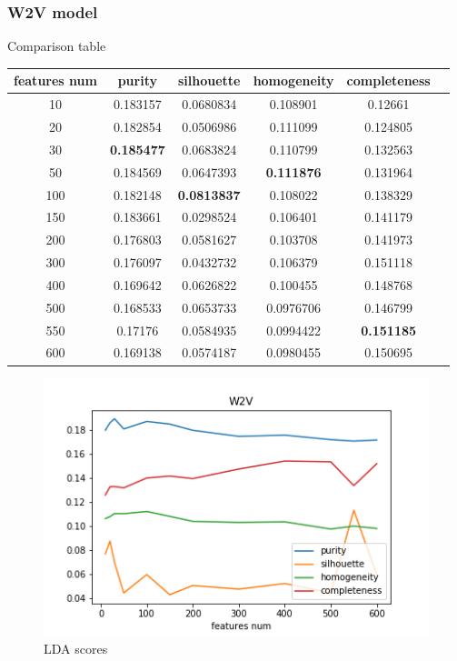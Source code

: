 \documentclass[11pt]{article}
\begin{document}
\subsubsection{W2V model}

Comparison table

\begin{center}
\begin{tabular}{ |c|c|c|c|c|c| }
\hline
features num & purity  & silhouette  & homogeneity  & completeness\\ \hline 
10  & 0.183157  & 0.0680834  & 0.108901  & 0.12661\\ \hline 
20  & 0.182854  & 0.0506986  & 0.111099  & 0.124805\\ \hline 
30  & \textbf{0.185477}  & 0.0683824  & 0.110799  & 0.132563\\ \hline 
50  & 0.184569  & 0.0647393  & \textbf{0.111876}  & 0.131964\\ \hline 
100  & 0.182148  & \textbf{0.0813837}  & 0.108022  & 0.138329\\ \hline 
150  & 0.183661  & 0.0298524  & 0.106401  & 0.141179\\ \hline 
200  & 0.176803  & 0.0581627  & 0.103708  & 0.141973\\ \hline 
300  & 0.176097  & 0.0432732  & 0.106379  & 0.151118\\ \hline 
400  & 0.169642  & 0.0626822  & 0.100455  & 0.148768\\ \hline 
500  & 0.168533  & 0.0653733  & 0.0976706  & 0.146799\\ \hline 
550  & 0.17176  & 0.0584935  & 0.0994422  & \textbf{0.151185}\\ \hline 
600  & 0.169138  & 0.0574187  & 0.0980455  & 0.150695\\ \hline \end{tabular}
\end{center}
\FloatBarrier

\begin{figure}[h]
\centering
 	\includegraphics[scale=0.7]{w2v_scores.png}
	\caption{LDA scores}
\label{w2v_scores}
\end{figure}
\FloatBarrier
\end{document}
